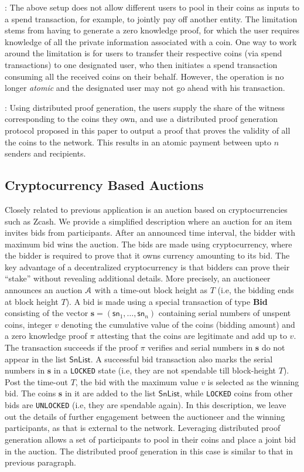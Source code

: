 : The above setup does not allow different users to pool in their coins as inputs to a spend transaction, for example,
to jointly pay off another entity. The limitation stems from having to generate a zero knowledge proof, for which the user requires knowledge of all the
private information associated with a coin. One way to work around the limitation is for users to transfer their respective coins (via spend transactions) 
to one designated user, who then initiates a spend transaction consuming all the received coins on their behalf. 
However, the operation is no longer {\em atomic} and the designated user may not go ahead with his transaction. 

: Using distributed proof generation, the users supply the share of the witness corresponding to the coins they own,
and use a distributed proof generation protocol proposed in this paper to output a proof that proves the validity of all the coins to the network. This
results in an atomic payment between upto $n$ senders and recipients.

\subsection{Cryptocurrency Based Auctions}
Closely related to previous application is an auction based on cryptocurrencies such as Zcash. We provide a simplified description where
an auction for an item invites bids from participants. After an announced time interval, the bidder with maximum bid wins the auction. The bids are
made using cryptocurrency, where the bidder is required to prove that it owns currency amounting to its bid. The key advantage of a decentralized
cryptocurrency is that bidders can prove their ``stake'' without revealing additional details. More precisely, an auctioneer announces an auction
$\mathcal{A}$ with a time-out block height as $T$ (i.e, the bidding ends at block height $T$). A bid is made using a special transaction of type {\bf Bid}
consisting of the vector $\bm{s}=(\mathsf{sn}_1,\ldots,\mathsf{sn}_n)$ containing serial numbers of unspent coins, integer $v$ denoting the cumulative
value of the coins (bidding amount) and a zero knowledge proof $\pi$ attesting that the coins are legitimate and add up to $v$. The transaction succeeds
if the proof $\pi$ verifies and serial numbers in $\bm{s}$ do not appear in the list $\mathsf{SnList}$. A successful bid transaction also marks
the serial numbers in $\bm{s}$ in a {\tt LOCKED} state (i.e, they are not spendable till block-height $T$). Post the time-out $T$, 
the bid with the maximum value $v$ is selected as the winning bid. The 
coins $\bm{s}$ in it are added to the list $\mathsf{SnList}$, while {\tt LOCKED} coins from other bids are {\tt UNLOCKED} (i.e, they are spendable again).
In this description, we leave out the details of further engagement between the auctioneer and the winning participants, as that is external to the network.
Leveraging distributed proof generation allows a set of participants to pool in their coins and place a joint bid in the auction. The distributed proof
generation in this case is similar to that in previous paragraph.



